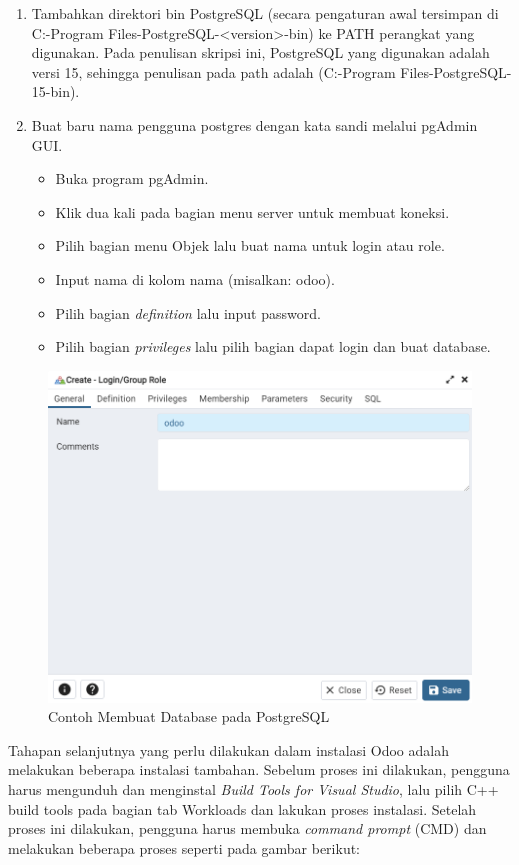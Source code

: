 \begin{enumerate}
	\item Tambahkan direktori bin PostgreSQL (secara pengaturan awal tersimpan di C:-Program Files-PostgreSQL-<version>-bin) ke PATH perangkat yang digunakan. Pada penulisan skripsi ini, PostgreSQL yang digunakan adalah versi 15, sehingga penulisan pada path adalah (C:-Program Files-PostgreSQL-15-bin).
	\item Buat baru nama pengguna postgres dengan kata sandi melalui pgAdmin GUI.
		\begin{itemize}
			\item Buka program pgAdmin.
			\item Klik dua kali pada bagian menu server untuk membuat koneksi.
			\item Pilih bagian menu Objek lalu buat nama untuk login atau role.
			\item Input nama di kolom nama (misalkan: odoo).
			\item Pilih bagian \textit{definition} lalu input password.
			\item Pilih bagian \textit{privileges} lalu pilih bagian dapat login dan buat database.
		\end{itemize}
\end{enumerate}

\begin{figure}[H]
	\centering
	\includegraphics[scale=0.7]{Gambar/psql.png}
	\caption{Contoh Membuat Database pada PostgreSQL} 
	\label{fig:psql}
\end{figure}

Tahapan selanjutnya yang perlu dilakukan dalam instalasi Odoo adalah melakukan beberapa instalasi tambahan. Sebelum proses ini dilakukan, pengguna harus mengunduh dan menginstal \textit{Build Tools for Visual Studio}, lalu pilih C++ build tools pada bagian tab Workloads dan lakukan proses instalasi. Setelah proses ini dilakukan, pengguna harus membuka \textit{command prompt} (CMD) dan melakukan beberapa proses seperti pada gambar berikut:

